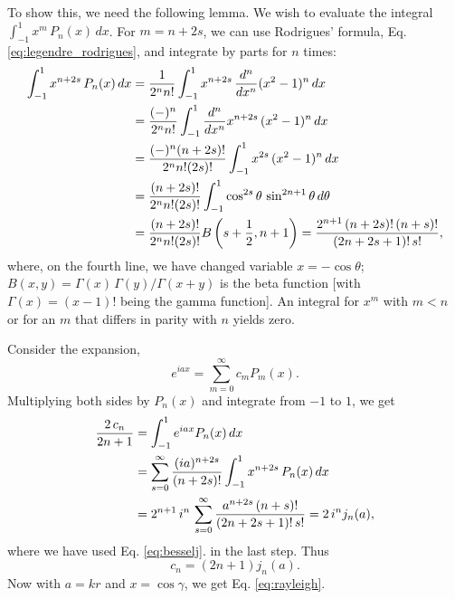 \documentclass[11pt]{article}
\begin{document}
To show this, we need the following lemma.
%
We wish to evaluate the integral
$\int_{-1}^1 x^m \, P_n(x) \, dx$.
%
For $m = n + 2 s$, we can use
Rodrigues' formula, Eq. \eqref{eq:legendre_rodrigues},
and integrate by parts for $n$ times:
\begin{align*}
\int_{-1}^1 x^{n + 2s} \, P_n(x) \, dx
&=
\frac{ 1 } { 2^n n! }
\int_{-1}^1 x^{n + 2 s} \,
\frac{d^n}{dx^n} (x^2 - 1)^n \, dx
\notag \\
&=
\frac{ (-)^n } { 2^n n! }
\int_{-1}^1 \frac{d^n}{dx^n} x^{n + 2 s} \,
(x^2 - 1)^n \, dx
\notag \\
&=
\frac{ (-)^n (n + 2 s)! } { 2^n n! (2 s)! }
\int_{-1}^1 x^{2 s} \,
(x^2 - 1)^n \, dx
\notag \\
&=
\frac{ (n + 2 s)! } { 2^n n! (2 s)! }
\int_{-1}^1 \cos^{2 s}\theta \,
\sin^{2n + 1}\theta \, d\theta
\notag \\
&=
\frac{ (n + 2 s)! } { 2^n n! (2 s)! }
B\left(s + \frac{1}{2}, n + 1\right)
=
\frac{ 2^{n+1} \, (n + 2 s)! \, (n + s)! } { (2 n + 2 s + 1)! \, s! },
\notag \\
\end{align*}
where,
on the fourth line,
we have changed variable $x = -\cos\theta$;
%
$B(x, y) = \Gamma(x) \, \Gamma(y) / \Gamma(x + y)$
is the beta function
[with $\Gamma(x) = (x-1)!$ being the gamma function].
%
An integral for $x^m$ with $m < n$
or for an $m$ that differs in parity with $n$
yields zero.


Consider the expansion,
\[
  e^{iax} = \sum_{m = 0}^\infty c_m P_m(x).
\]
Multiplying both sides by $P_n(x)$ and integrate from $-1$ to $1$,
we get
\begin{align*}
  \frac{ 2 \, c_n } { 2 n + 1}
&=
  \int_{-1}^1
  e^{iax} P_n(x) \, dx
  \notag \\
&=
  \sum_{s = 0}^\infty
  \frac{ (ia)^{n + 2s} } { (n + 2s)! }
  \int_{-1}^1
  x^{n + 2 s} \, P_n(x) \, dx
  \notag \\
&=
  2^{n+1} \, i^n \,
  \sum_{s = 0}^\infty
  \frac{ a^{n + 2s} \, (n + s)! }
  { (2n + 2s + 1)! \, s! }
= 2 \, i^n j_n(a),
\end{align*}
where we have used Eq. \eqref{eq:besselj}.
in the last step.
%
Thus
\[
  c_n = (2 n + 1) j_n(a).
\]
Now with $a = kr$ and $x = \cos\gamma$, we get Eq. \eqref{eq:rayleigh}.





\end{document}
